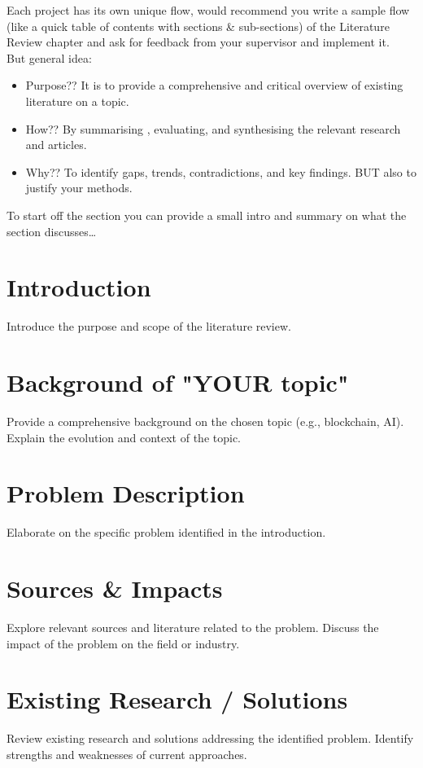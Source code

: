 Each project has its own unique flow, would recommend you write a sample flow (like a quick table of contents with sections \& sub-sections) of the Literature Review chapter and ask for feedback from your supervisor and implement it.\\
But general idea:\\
\begin{itemize}
    \item Purpose?? It is to provide a comprehensive and critical overview of existing literature on a topic.\\
    \item How?? By summarising , evaluating, and synthesising the relevant research and articles.\\
    \item Why?? To identify gaps, trends, contradictions, and key findings. BUT also to justify your methods.
\end{itemize}


To start off the section you can provide a small intro and summary on what the section discusses\ldots

\section{Introduction}
Introduce the purpose and scope of the literature review.

\section{Background of "YOUR topic"}
Provide a comprehensive background on the chosen topic (e.g., blockchain, AI).
Explain the evolution and context of the topic.

\section{Problem Description}
Elaborate on the specific problem identified in the introduction.

\section{Sources \& Impacts}
Explore relevant sources and literature related to the problem.
Discuss the impact of the problem on the field or industry.

\section{Existing Research / Solutions}
Review existing research and solutions addressing the identified problem.
Identify strengths and weaknesses of current approaches.

